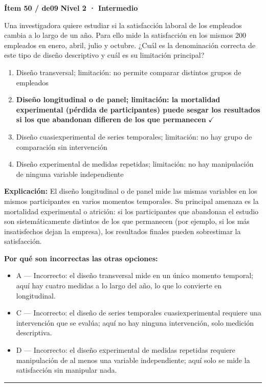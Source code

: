 \documentclass[12pt,a4paper]{article}
\begin{document}
\begin{mdframed}[backgroundcolor=fondogris,linecolor=ambar,linewidth=1pt,innerleftmargin=10pt,innerrightmargin=10pt,innertopmargin=7pt,innerbottommargin=7pt]
\textbf{Ítem 50 / de09} \hfill {\small\bfseries\color{ambar} Nivel 2 · Intermedio}
\end{mdframed}

Una investigadora quiere estudiar si la satisfacción laboral de los empleados cambia a lo largo de un año. Para ello mide la satisfacción en los mismos 200 empleados en enero, abril, julio y octubre. ¿Cuál es la denominación correcta de este tipo de diseño descriptivo y cuál es su limitación principal?

\begin{enumerate}
  \item[A.] Diseño transversal; limitación: no permite comparar distintos grupos de empleados
  \item[\textbf{\color{verde}B.}] \textbf{\color{verde} Diseño longitudinal o de panel; limitación: la mortalidad experimental (pérdida de participantes) puede sesgar los resultados si los que abandonan difieren de los que permanecen} \hfill $\checkmark$
  \item[C.] Diseño cuasiexperimental de series temporales; limitación: no hay grupo de comparación sin intervención
  \item[D.] Diseño experimental de medidas repetidas; limitación: no hay manipulación de ninguna variable independiente
\end{enumerate}

\noindent\textbf{\color{azul}Explicación:} El diseño longitudinal o de panel mide las mismas variables en los mismos participantes en varios momentos temporales. Su principal amenaza es la mortalidad experimental o atrición: si los participantes que abandonan el estudio son sistemáticamente distintos de los que permanecen (por ejemplo, si los más insatisfechos dejan la empresa), los resultados finales pueden sobrestimar la satisfacción.

\noindent\textbf{\color{gris}Por qué son incorrectas las otras opciones:}
\begin{itemize}
  \item {\small A — Incorrecto: el diseño transversal mide en un único momento temporal; aquí hay cuatro medidas a lo largo del año, lo que lo convierte en longitudinal.}
  \item {\small C — Incorrecto: el diseño de series temporales cuasiexperimental requiere una intervención que se evalúa; aquí no hay ninguna intervención, solo medición descriptiva.}
  \item {\small D — Incorrecto: el diseño experimental de medidas repetidas requiere manipulación de al menos una variable independiente; aquí solo se mide la satisfacción sin manipular nada.}
\end{itemize}
\vspace{8pt}\hrule\vspace{10pt}
\end{document}
